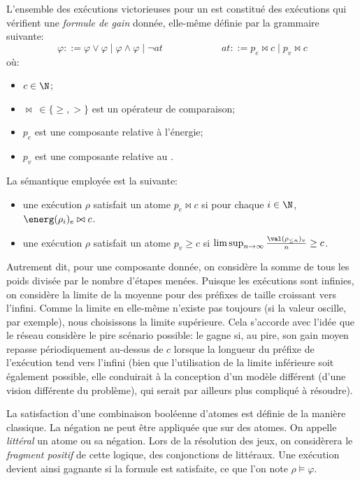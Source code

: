 L'ensemble des exécutions victorieuses pour un  est constitué des exécutions qui vérifient une \emph{formule de gain} donnée, elle-même définie par la grammaire suivante:
\[ \varphi ::= \varphi \vee \varphi \mid \varphi \wedge \varphi \mid \neg\mathit{at}
\hspace{6em}
\mathit{at} ::= p_e \bowtie c \mid p_v \bowtie c \]
où:
\begin{itemize}
    \item $c \in \N$;
    \item $\bowtie\ \in \{\geq,>\}$ est un opérateur de comparaison;
    \item $p_e$ est une composante relative à l'énergie;
    \item $p_v$ est une composante relative au .
\end{itemize}

La sémantique employée est la suivante:
\begin{itemize}
    \item une exécution $\rho$ satisfait un atome $p_e \bowtie c$ si pour chaque $i \in \N$, $\energ(\rho_i)_e \bowtie c$.
    \item une exécution $\rho$ satisfait un atome $p_v \geq c$ si $\limsup_{n \rightarrow \infty} \frac{\val(\rho_{\leq n})_v}{n} \geq c$.
\end{itemize}
Autrement dit, pour une composante donnée, on considère la somme de tous les poids divisée par le nombre d'étapes menées.
Puisque les exécutions sont infinies, on considère la limite de la moyenne pour des préfixes de taille croissant vers l'infini.
Comme la limite en elle-même n'existe pas toujours (si la valeur oscille, par exemple), nous choisissons la limite supérieure.
Cela s'accorde avec l'idée que le réseau considère le pire scénario possible: le  gagne si, au pire, son gain moyen repasse périodiquement au-dessus de $c$ lorsque la longueur du préfixe de l'exécution tend vers l'infini (bien que l'utilisation de la limite inférieure soit également possible, elle conduirait à la conception d'un modèle différent (d'une vision différente du problème), qui serait par ailleurs plus compliqué à résoudre).

La satisfaction d'une combinaison booléenne d'atomes est définie de la manière classique.
La négation ne peut être appliquée que sur des atomes.
On appelle \emph{littéral} un atome ou sa négation.
Lors de la résolution des jeux, on considèrera le \emph{fragment positif} de cette logique, \cad des conjonctions de littéraux.
Une exécution devient ainsi gagnante si la formule est satisfaite, ce que l'on note $\rho\vDash\varphi$.

